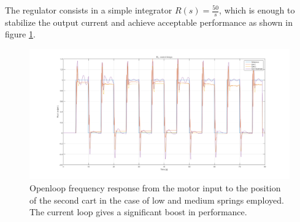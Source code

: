 The regulator consists in a simple integrator $R(s)=\frac{50}{s}$, which is enough to stabilize the output current and achieve acceptable performance as shown in figure \ref{fig:hinf23dof}.


\begin{figure}[h]
\centering
\includegraphics[width=0.5\linewidth]{img/hinf2.png}
\caption{Openloop frequency response from the motor input to the position of the second cart in the case of low and medium springs employed. The current loop gives a significant boost in performance.}
\label{fig:hinf23dof}
\end{figure}